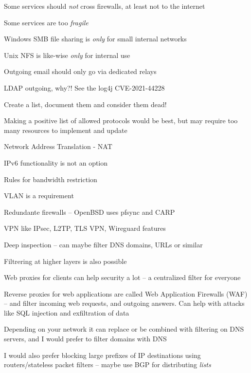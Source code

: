 \documentclass[Screen16to9,17pt]{foils}
\begin{document}
\begin{list1}
\item Some services should \emph{not} cross firewalls, at least not to the internet
\item Some services are too \emph{fragile}

\begin{list2}
\item Windows SMB file sharing is \emph{only} for small internal networks
\item Unix NFS is like-wise \emph{only} for internal use
\item Outgoing email should only go via dedicated relays
\item LDAP outgoing, why?! See the log4j CVE-2021-44228
\item Create a list, document them and consider them dead!
\end{list2}
\item Making a positive list of allowed protocols would be best, but may require too many resources to implement and update
\end{list1}


\begin{list2}
\item Network Address Translation - NAT
\item IPv6 functionality is not an option

\item Rules for bandwidth restriction
\item VLAN is a requirement
\item Redundante firewalls -- OpenBSD uses pfsync and CARP
\item VPN like IPsec, L2TP, TLS VPN, Wireguard features
\item Deep inspection -- can maybe filter DNS domains, URLs or similar
\end{list2}


\begin{list2}
\item Filtrering at higher layers is also possible
\item Web proxies for clients can help security a lot -- a centralized filter for everyone

\item Reverse proxies for web applications are called
Web Application Firewalls (WAF) -- and filter incoming web requests, and outgoing answers. Can help with attacks like SQL injection and exfiltration of data
\item Depending on your network it can replace or be combined with filtering on DNS servers, and I would prefer to filter domains with DNS
\item I would also prefer blocking large prefixes of IP destinations using routers/stateless packet filters -- maybe use BGP for distributing \emph{lists}
\end{list2}
\end{document}

